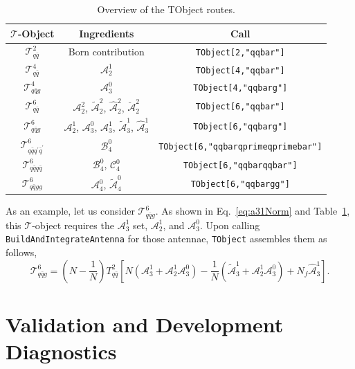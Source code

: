 \begin{table}[h!]
\centering
\renewcommand{\arraystretch}{1.3}
  \begin{tabular}{|c|c|c|} 
   \hline
   \textbf{$\mathcal T$-Object} & \textbf{Ingredients} & \textbf{Call} \\ 
   \hline
   $\mathcal T_{q\bar q}^2$ & Born contribution & \texttt{TObject[2,"qqbar"]} \\ \hline
   $\mathcal T_{q\bar q}^4$ & $\mathcal A_2^1$ & \texttt{TObject[4,"qqbar"]} \\ \hline
   $\mathcal T_{q\bar qg}^4$ & $\mathcal A_3^0$ & \texttt{TObject[4,"qqbarg"]} \\ \hline
   $\mathcal T_{q\bar q}^6$ & $\mathcal A_2^2$, $\tilde {\mathcal A}_2^2$, $\hat {\mathcal A}_2^2$, $\breve {\mathcal A}_2^2$ & \texttt{TObject[6,"qqbar"]} \\ \hline
   $\mathcal T_{q\bar qg}^6$ & $\mathcal A_2^1$, $\mathcal A_3^0$, $\mathcal A_3^1$, $\tilde {\mathcal A}_3^1$, $\hat {\mathcal A}_3^1$ & \texttt{TObject[6,"qqbarg"]} \\ \hline
   $\mathcal T_{q\bar qq^\prime\bar q^\prime}^6$ & $\mathcal B_4^0$ & \texttt{TObject[6,"qqbarqprimeqprimebar"]} \\ \hline
   $\mathcal T_{q\bar qq\bar q}^6$ & $\mathcal B_4^0$, $\mathcal C_4^0$ & \texttt{TObject[6,"qqbarqqbar"]} \\ \hline
   $\mathcal T_{q\bar qgg}^6$ & $\mathcal A_4^0$, $\tilde{\mathcal A}_4^0$ & \texttt{TObject[6,"qqbargg"]} \\ \hline
  \end{tabular}
   \caption{Overview of the TObject routes.}
\label{tab:TObject}
\end{table}
As an example, let us consider $\mathcal T_{q\bar qg}^6$. As shown in Eq.~\eqref{eq:a31Norm}
and Table~\ref{tab:TObject}, this $\mathcal T$-object requires the $\mathcal A_3^1$ set, 
$\mathcal A_2^1$, and $\mathcal A_3^0$. Upon calling \texttt{BuildAndIntegrateAntenna}
for those antennae, \texttt{TObject} assembles them as follows,
\begin{equation}
    \mathcal T_{q\bar qg}^6 = \left(N-\frac1N\right)T_{q\bar q}^2\left[N\!\left(\mathcal A_3^1+\mathcal A_2^1\mathcal A_3^0\right)-\frac1N\!\left(\tilde{\mathcal A}_3^1+\mathcal A_2^1\mathcal A_3^0\right)+N_f\hat{\mathcal A}_3^1\right].
\end{equation}
\fi

\section{Validation and Development Diagnostics}\label{sec:validationDiagnostics}

